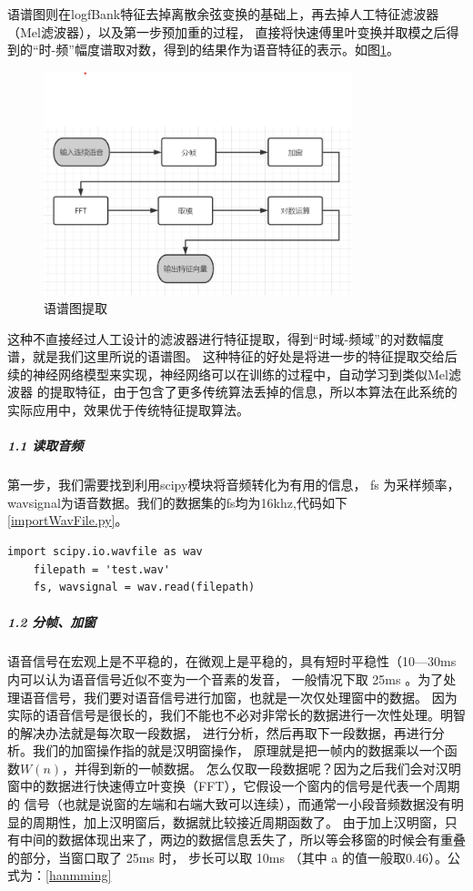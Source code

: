 \documentclass[12pt,a4paper,fancyhdr,openany,oneside]{ctexbook}
\begin{document}
语谱图则在logfBank特征去掉离散余弦变换的基础上，再去掉人工特征滤波器（Mel滤波器），以及第一步预加重的过程，
直接将快速傅里叶变换并取模之后得到的“时-频”幅度谱取对数，得到的结果作为语音特征的表示。如图\ref{spectrogram.png}。
\begin{figure}[htbp]
    \centering
        \includegraphics[width=0.8\textwidth]{resource/img/spectrogram.png}
        \caption{语谱图提取}
        \label{spectrogram.png}
\end{figure}

这种不直接经过人工设计的滤波器进行特征提取，得到“时域-频域”的对数幅度谱，就是我们这里所说的语谱图。
这种特征的好处是将进一步的特征提取交给后续的神经网络模型来实现，神经网络可以在训练的过程中，自动学习到类似Mel滤波器
的提取特征，由于包含了更多传统算法丢掉的信息，所以本算法在此系统的实际应用中，效果优于传统特征提取算法。


\subparagraph{1.1 读取音频} 第一步，我们需要找到利用scipy模块将音频转化为有用的信息， fs 为采样频率，
wavsignal为语音数据。我们的数据集的fs均为16khz,代码如下\ref{importWavFile.py}。
\begin{lstlisting}[style=Python,
    caption={importWavFile.py},
    label={importWavFile.py}]
    import scipy.io.wavfile as wav
    filepath = 'test.wav'
    fs, wavsignal = wav.read(filepath)
\end{lstlisting}


\subparagraph{1.2 分帧、加窗} 
语音信号在宏观上是不平稳的，在微观上是平稳的，具有短时平稳性（10—30ms内可以认为语音信号近似不变为一个音素的发音，
一般情况下取 25ms 。为了处理语音信号，我们要对语音信号进行加窗，也就是一次仅处理窗中的数据。
因为实际的语音信号是很长的，我们不能也不必对非常长的数据进行一次性处理。明智的解决办法就是每次取一段数据，
进行分析，然后再取下一段数据，再进行分析。我们的加窗操作指的就是汉明窗操作，
原理就是把一帧内的数据乘以一个函数$ W\left ( n \right ) $，并得到新的一帧数据。
怎么仅取一段数据呢？因为之后我们会对汉明窗中的数据进行快速傅立叶变换（FFT），它假设一个窗内的信号是代表一个周期的
信号（也就是说窗的左端和右端大致可以连续），而通常一小段音频数据没有明显的周期性，加上汉明窗后，数据就比较接近周期函数了。
由于加上汉明窗，只有中间的数据体现出来了，两边的数据信息丢失了，所以等会移窗的时候会有重叠的部分，当窗口取了 25ms 时，
步长可以取 10ms （其中 a 的值一般取0.46）。公式为：\ref{hanmming}
\end{document}
